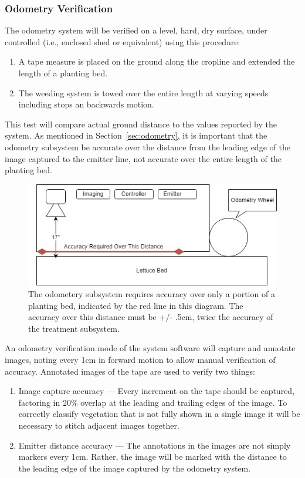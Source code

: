 \documentclass[12pt]{article}
\begin{document}
\subsubsection{Odometry Verification}
The odometry system will be verified on a level, hard, dry surface, under controlled (i.e., enclosed shed or equivalent) using this procedure:
\begin{enumerate}
	\item{A tape measure is placed on the ground along the cropline and extended the length of a planting bed.}
	\item{The weeding system is towed over the entire length at varying speeds including stops an backwards motion.}
\end{enumerate}
This test will compare actual ground distance to the values reported by the system.  As mentioned in Section~\ref{sec:odometry}, it is important that the odometry subsystem be accurate over the distance from the leading edge of the image captured to the emitter line, not accurate over the entire length of the planting bed.
\begin{figure}[H]
	\centering
	\includegraphics[width=0.75\linewidth]{./figures/odometry-accuracy.jpg}
	\caption[Accuracy required from odometry subsystem]{The odometery subsystem requires accuracy over only a portion of a planting bed, indicated by the red line in this diagram.  The accuracy over this distance must be +/- .5cm, twice the accuracy of the treatment subsystem.}
	\label{fig:uml-system}
\end{figure}
An odometry verification mode of the system software will capture and annotate images, noting every 1cm in forward motion to allow manual verification of accuracy.  Annotated images of the tape are used to verify two things:
\begin{enumerate}
	\item{Image capture accuracy --- Every increment on the tape should be captured, factoring in 20\% overlap at the leading and trailing edges of the image. To correctly classify vegetation that is not fully shown in a single image it will be necessary to stitch adjacent images together.}
	\item{Emitter distance accuracy --- The annotations in the images are not simply markers every 1cm. Rather, the image will be marked with the distance to the leading edge of the image captured by the odometry system.}
\end{enumerate}
\end{document}
